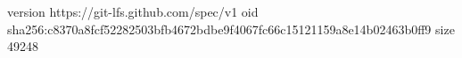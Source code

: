 version https://git-lfs.github.com/spec/v1
oid sha256:c8370a8fcf52282503bfb4672bdbe9f4067fc66c15121159a8e14b02463b0ff9
size 49248
